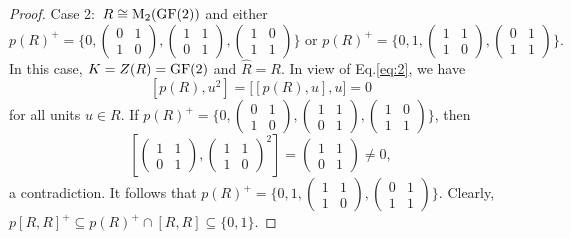 \documentclass[11pt]{article}
\theoremstyle{definition}
\begin{document}
{{{{\begin{proof}
Case 2:\ $R\cong {\rm M}_2({\rm GF}(2))$ and either
					\[
					p(R)^+=\{0, \begin{pmatrix}
						0 & 1 \\
						1 & 0
					\end{pmatrix}, \begin{pmatrix}
						1& 1 \\
						0 & 1
					\end{pmatrix},  \begin{pmatrix}
						1& 0 \\
						1 & 1
					\end{pmatrix}\} \text{ or }
					p(R)^+=\{0, 1, \begin{pmatrix}
						1 & 1 \\
						1 & 0
					\end{pmatrix}, \begin{pmatrix}
						0 & 1 \\
						1 & 1
					\end{pmatrix}\}.
					\]
In this case, $K=Z(R)=\text{\rm GF}(2)$ and $\widehat R=R$. In view of Eq.\eqref{eq:2}, we have
$$
[p(R), u^2]=\big[[p(R), u], u\big]=0
$$
for all units $u\in R$. If $p(R)^+=\{0, \begin{pmatrix}
						0 & 1 \\
						1 & 0
					\end{pmatrix}, \begin{pmatrix}
						1& 1 \\
						0 & 1
					\end{pmatrix},  \begin{pmatrix}
						1& 0 \\
						1 & 1
					\end{pmatrix}\}$, then
$$
[\begin{pmatrix}
						1& 1 \\
						0 & 1
					\end{pmatrix}, \begin{pmatrix}
						1& 1 \\
						1 & 0
					\end{pmatrix}^2]=\begin{pmatrix}
						1& 1 \\
						0 & 1
					\end{pmatrix}\ne 0,
$$
a contradiction. It follows that $p(R)^+=\{0, 1, \begin{pmatrix}
						1 & 1 \\
						1 & 0
					\end{pmatrix}, \begin{pmatrix}
						0 & 1 \\
						1 & 1
					\end{pmatrix}\}$. Clearly, $p[R, R]^+\subseteq p(R)^+\cap [R, R]\subseteq \{0, 1\}$.


\end{proof}}}}}
\end{document}
